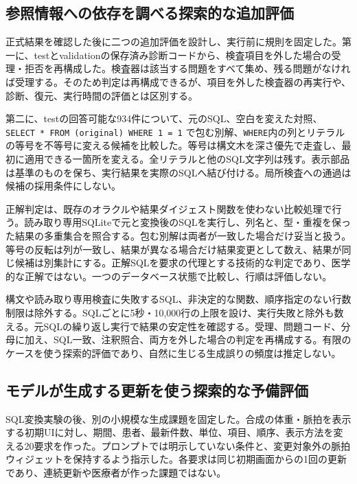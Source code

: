 \documentclass[manuscript,review,anonymous]{acmart}
\begin{document}
\subsection{参照情報への依存を調べる探索的な追加評価}
\label{sec:stress-method}

正式結果を確認した後に二つの追加評価を設計し、実行前に規則を固定した。第一に、testとvalidationの保存済み診断コードから、検査項目を外した場合の受理・拒否を再構成した。検査器は該当する問題をすべて集め、残る問題がなければ受理する。そのため判定は再構成できるが、項目を外した検査器の再実行や、診断、復元、実行時間の評価とは区別する。

第二に、testの回答可能な934件について、元のSQL、空白を変えた対照、\texttt{SELECT * FROM (original) WHERE 1 = 1} で包む別解、\texttt{WHERE}内の列とリテラルの等号を不等号に変える候補を比較した。等号は構文木を深さ優先で走査し、最初に適用できる一箇所を変える。全リテラルと他のSQL文字列は残す。表示部品は基準のものを保ち、実行結果を実際のSQLへ結び付ける。局所検査への通過は候補の採用条件にしない。

正解判定は、既存のオラクルや結果ダイジェスト関数を使わない比較処理で行う。読み取り専用SQLiteで元と変換後のSQLを実行し、列名と、型・重複を保った結果の多重集合を照合する。包む別解は両者が一致した場合だけ妥当と扱う。等号の反転は列が一致し、結果が異なる場合だけ結果変更として数え、結果が同じ候補は別集計にする。正解SQLを要求の代理とする技術的な判定であり、医学的な正解ではない。一つのデータベース状態で比較し、行順は評価しない。

構文や読み取り専用検査に失敗するSQL、非決定的な関数、順序指定のない行数制限は除外する。SQLごとに5秒・10,000行の上限を設け、実行失敗と除外も数える。元SQLの繰り返し実行で結果の安定性を確認する。受理、問題コード、分母に加え、SQL一致、注釈照合、両方を外した場合の判定を再構成する。有限のケースを使う探索的評価であり、自然に生じる生成誤りの頻度は推定しない。

\subsection{モデルが生成する更新を使う探索的な予備評価}
\label{sec:generated-pilot}

SQL変換実験の後、別の小規模な生成課題を固定した。合成の体重・脈拍を表示する初期UIに対し、期間、患者、最新件数、単位、項目、順序、表示方法を変える20要求を作った。プロンプトでは明示していない条件と、変更対象外の脈拍ウィジェットを保持するよう指示した。各要求は同じ初期画面からの1回の更新であり、連続更新や医療者が作った課題ではない。
\end{document}
